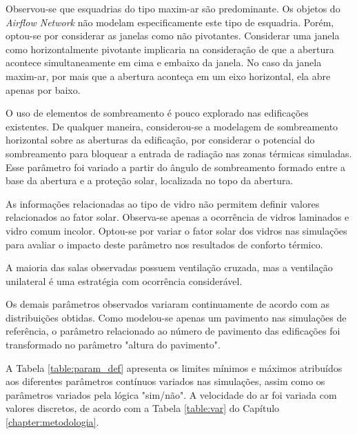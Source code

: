 \documentclass[brazil,hardcopy,openany,a4paper]{ufscthesis}
\begin{document}
	Observou-se que esquadrias do tipo maxim-ar são predominante. Os objetos do \textit{Airflow Network} não modelam especificamente este tipo de esquadria. Porém, optou-se por considerar as janelas como não pivotantes. Considerar uma janela como horizontalmente pivotante implicaria na consideração de que a abertura acontece simultaneamente em cima e embaixo da janela. No caso da janela maxim-ar, por mais que a abertura aconteça em um eixo horizontal, ela abre apenas por baixo.
	
	O uso de elementos de sombreamento é pouco explorado nas edificações existentes. De qualquer maneira, considerou-se a modelagem de sombreamento horizontal sobre as aberturas da edificação, por considerar o potencial do sombreamento para bloquear a entrada de radiação nas zonas térmicas simuladas. Esse parâmetro foi variado a partir do ângulo de sombreamento formado entre a base da abertura e a proteção solar, localizada no topo da abertura.
	
	As informações relacionadas ao tipo de vidro não permitem definir valores relacionados ao fator solar. Observa-se apenas a ocorrência de vidros laminados e vidro comum incolor. Optou-se por variar o fator solar dos vidros nas simulações para avaliar o impacto deste parâmetro nos resultados de conforto térmico.
	
	A maioria das salas observadas possuem ventilação cruzada, mas a ventilação unilateral é uma estratégia com ocorrência considerável.
	
	Os demais parâmetros observados variaram continuamente de acordo com as distribuições obtidas. Como modelou-se apenas um pavimento nas simulações de referência, o parâmetro relacionado ao número de pavimento das edificações foi transformado no parâmetro "altura do pavimento".
	
	A Tabela \ref{table:param_def} apresenta os limites mínimos e máximos atribuídos aos diferentes parâmetros contínuos variados nas simulações, assim como os parâmetros variados pela lógica "sim/não". A velocidade do ar foi variada com valores discretos, de acordo com a Tabela \ref{table:var} do Capítulo \ref{chapter:metodologia}.
	
\end{document}
